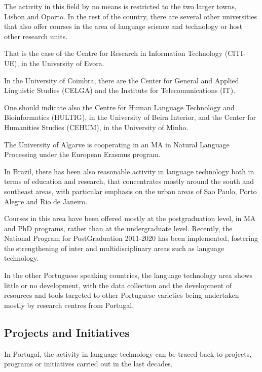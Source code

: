 \begin{multicols}{2}
The activity in this field by no means is restricted to the two larger towns, Lisbon and Oporto.
In the rest of the country, there are several other universities that also offer courses in the area of language 
science and technology or host other research units.

That is the case of the Centre for Research in Information Technology (CITI-UE), in the University of Evora.

In the University of Coimbra, there are the Center for General and Applied Linguistic Studies (CELGA)
and the Institute for Telecomunications (IT).

One should indicate also the Centre for Human Language Technology and Bioinformatics (HULTIG), in the University of Beira Interior,
and the Center for Humanities Studies (CEHUM), in the University of Minho. 

The University of Algarve is cooperating in an MA in Natural Language Processing under the European Erasmus program.


In Brazil, there has been also reasonable activity in language technology both in terms of education and research, 
that concentrates mostly around  the south and southeast areas,
with particular emphasis on the urban areas of Sao Paulo, Porto Alegre and Rio de Janeiro. 

Courses in this area have been offered mostly at the postgraduation level, in MA and PhD programs, rather than at the undergraduate level. 
Recently, the National Program for PostGraduation 2011-2020 has been implemented, fostering the strengthening of inter and multidisciplinary 
areas such as language technology.

In the other Portuguese speaking countries, the language technology area shows little or no development, with the data collection and the development of resources and tools targeted to other Portuguese varieties being undertaken 
mostly by research centres from Portugal.

\subsection{Projects and Initiatives}

 In Portugal, the activity in language technology can be traced back to projects, programs or initiatives carried out in the last decades. 


\end{multicols}
